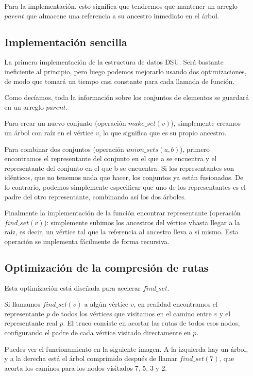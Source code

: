 Para la implementación, esto significa que tendremos que mantener un arreglo $parent$ que almacene una referencia a su ancestro inmediato en el árbol.

\subsection{Implementación sencilla}

La primera implementación de la estructura de datos DSU. Será bastante ineficiente al principio, pero luego podemos mejorarlo usando dos optimizaciones, de modo que tomará un tiempo casi constante para cada llamada de función.

Como decíamos, toda la información sobre los conjuntos de elementos se guardará en un arreglo $parent$.

Para crear un nuevo conjunto (operación $make\_set(v)$), simplemente creamos un árbol con raíz en el vértice $v$, lo que significa que es su propio ancestro.

Para combinar dos conjuntos (operación $union\_sets(a, b)$), primero encontramos el representante del conjunto en el que a se encuentra y el representante del conjunto en el que b se encuentra. Si los representantes son idénticos, que no tenemos nada que hacer, los conjuntos ya están fusionados. De lo contrario, podemos simplemente especificar que uno de los representantes es el padre del otro representante, combinando así los dos árboles.

Finalmente la implementación de la función encontrar representante (operación $find\_set(v)$): simplemente subimos los ancestros del vértice vhasta llegar a la raíz, es decir, un vértice tal que la referencia al ancestro lleva a sí mismo. Esta operación se implementa fácilmente de forma recursiva.

\subsection{Optimización de la compresión de rutas}

Esta optimización está diseñada para acelerar $find\_set$.

Si llamamos $find\_set(v)$ a algún vértice $v$, en realidad encontramos el representante $p$ de todos los vértices que visitamos en el camino entre $v$ y el representante real $p$. El truco consiste en acortar las rutas de todos esos nodos, configurando el padre de cada vértice visitado directamente en $p$.

Puedes ver el funcionamiento en la siguiente imagen. A la izquierda hay un árbol, y a la derecha está el árbol comprimido después de llamar $find\_set(7)$, que acorta los caminos para los nodos visitados 7, 5, 3 y 2.

